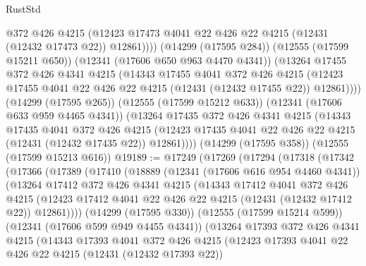 \begin{lexlean}{RustStd}
\begin{coremodule}
              @372
              @426
              @4215
              (@12423 @17473 @4041 @22 @426 @22 @4215 (@12431 (@12432 @17473 @22)) @12861))))
        (@14299 (@17595 @284))
        (@12555 (@17599 @15211 @650))
        (@12341 (@17606 @650 @963 @4470 @4341))
        (@13264
          @17455
          @372
          @426
          @4341
          @4215
          (@14343
            @17455
            @4041
            @372
            @426
            @4215
            (@12423 @17455 @4041 @22 @426 @22 @4215 (@12431 (@12432 @17455 @22)) @12861))))
      (@14299 (@17595 @265))
      (@12555 (@17599 @15212 @633))
      (@12341 (@17606 @633 @959 @4465 @4341))
      (@13264
        @17435
        @372
        @426
        @4341
        @4215
        (@14343
          @17435
          @4041
          @372
          @426
          @4215
          (@12423 @17435 @4041 @22 @426 @22 @4215 (@12431 (@12432 @17435 @22)) @12861))))
    (@14299 (@17595 @358))
    (@12555 (@17599 @15213 @616))
@19189 := @17249
    (@17269
      (@17294
        (@17318
          (@17342
            (@17366
              (@17389
                (@17410
                  (@18889
                    (@12341 (@17606 @616 @954 @4460 @4341))
                    (@13264
                      @17412
                      @372
                      @426
                      @4341
                      @4215
                      (@14343
                        @17412
                        @4041
                        @372
                        @426
                        @4215
                        (@12423
                          @17412
                          @4041
                          @22
                          @426
                          @22
                          @4215
                          (@12431 (@12432 @17412 @22))
                          @12861))))
                  (@14299 (@17595 @330))
                  (@12555 (@17599 @15214 @599))
                  (@12341 (@17606 @599 @949 @4455 @4341))
                  (@13264
                    @17393
                    @372
                    @426
                    @4341
                    @4215
                    (@14343
                      @17393
                      @4041
                      @372
                      @426
                      @4215
                      (@12423
                        @17393
                        @4041
                        @22
                        @426
                        @22
                        @4215
                        (@12431 (@12432 @17393 @22))

\end{coremodule}
\end{lexlean}
